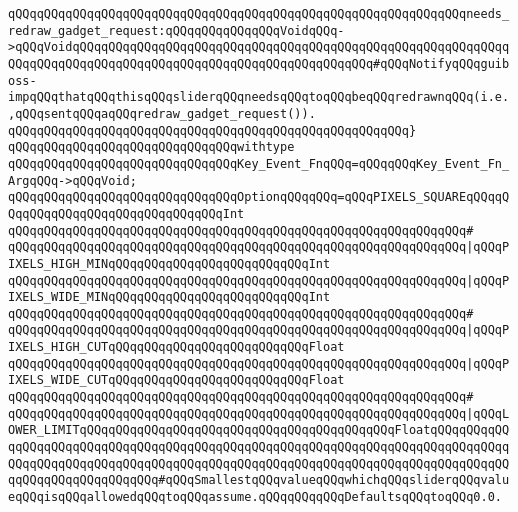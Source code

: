 \verb|qQQqqQQqqQQqqQQqqQQqqQQqqQQqqQQqqQQqqQQqqQQqqQQqqQQqqQQqqQQqqQQqneeds_redraw_gadget_request:qQQqqQQqqQQqqQQqVoidqQQq->qQQqVoidqQQqqQQqqQQqqQQqqQQqqQQqqQQqqQQqqQQqqQQqqQQqqQQqqQQqqQQqqQQqqQQqqQQqqQQqqQQqqQQqqQQqqQQqqQQqqQQqqQQqqQQqqQQqqQQq#qQQqNotifyqQQqguiboss-impqQQqthatqQQqthisqQQqsliderqQQqneedsqQQqtoqQQqbeqQQqredrawnqQQq(i.e.,qQQqsentqQQqaqQQqredraw_gadget_request()).|\newline
\verb|qQQqqQQqqQQqqQQqqQQqqQQqqQQqqQQqqQQqqQQqqQQqqQQqqQQqqQQq}|\newline
\verb|qQQqqQQqqQQqqQQqqQQqqQQqqQQqqQQqwithtype|\newline
\verb|qQQqqQQqqQQqqQQqqQQqqQQqqQQqqQQqKey_Event_FnqQQq=qQQqqQQqKey_Event_Fn_ArgqQQq->qQQqVoid;|\newline
\newline
\newline
\newline
\verb|qQQqqQQqqQQqqQQqqQQqqQQqqQQqqQQqOptionqQQqqQQq=qQQqPIXELS_SQUAREqQQqqQQqqQQqqQQqqQQqqQQqqQQqqQQqqQQqInt|\newline
\verb|qQQqqQQqqQQqqQQqqQQqqQQqqQQqqQQqqQQqqQQqqQQqqQQqqQQqqQQqqQQqqQQq#|\newline
\verb|qQQqqQQqqQQqqQQqqQQqqQQqqQQqqQQqqQQqqQQqqQQqqQQqqQQqqQQqqQQqqQQq|\verb#|qQQqPIXELS_HIGH_MINqQQqqQQqqQQqqQQqqQQqqQQqqQQqInt#\newline
\verb|qQQqqQQqqQQqqQQqqQQqqQQqqQQqqQQqqQQqqQQqqQQqqQQqqQQqqQQqqQQqqQQq|\verb#|qQQqPIXELS_WIDE_MINqQQqqQQqqQQqqQQqqQQqqQQqqQQqInt#\newline
\verb|qQQqqQQqqQQqqQQqqQQqqQQqqQQqqQQqqQQqqQQqqQQqqQQqqQQqqQQqqQQqqQQq#|\newline
\verb|qQQqqQQqqQQqqQQqqQQqqQQqqQQqqQQqqQQqqQQqqQQqqQQqqQQqqQQqqQQqqQQq|\verb#|qQQqPIXELS_HIGH_CUTqQQqqQQqqQQqqQQqqQQqqQQqqQQqFloat#\newline
\verb|qQQqqQQqqQQqqQQqqQQqqQQqqQQqqQQqqQQqqQQqqQQqqQQqqQQqqQQqqQQqqQQq|\verb#|qQQqPIXELS_WIDE_CUTqQQqqQQqqQQqqQQqqQQqqQQqqQQqFloat#\newline
\verb|qQQqqQQqqQQqqQQqqQQqqQQqqQQqqQQqqQQqqQQqqQQqqQQqqQQqqQQqqQQqqQQq#|\newline
\verb|qQQqqQQqqQQqqQQqqQQqqQQqqQQqqQQqqQQqqQQqqQQqqQQqqQQqqQQqqQQqqQQq|\verb#|qQQqLOWER_LIMITqQQqqQQqqQQqqQQqqQQqqQQqqQQqqQQqqQQqqQQqqQQqFloatqQQqqQQqqQQqqQQqqQQqqQQqqQQqqQQqqQQqqQQqqQQqqQQqqQQqqQQqqQQqqQQqqQQqqQQqqQQqqQQqqQQqqQQqqQQqqQQqqQQqqQQqqQQqqQQqqQQqqQQqqQQqqQQqqQQqqQQqqQQqqQQqqQQqqQQqqQQqqQQqqQQqqQQqqQQq#\verb|#qQQqSmallestqQQqvalueqQQqwhichqQQqsliderqQQqvalueqQQqisqQQqallowedqQQqtoqQQqassume.qQQqqQQqqQQqDefaultsqQQqtoqQQq0.0.|\newline
